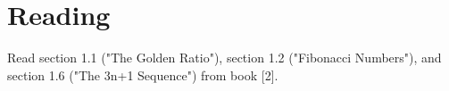 \section{Reading}
Read section 1.1 ("The Golden Ratio"), section 1.2 ("Fibonacci Numbers"), and section 1.6 ("The 3n+1 Sequence") from book [2].






